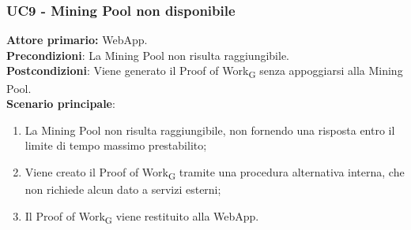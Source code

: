 \subsubsection{UC9  - Mining Pool non disponibile}
\textbf{Attore primario:} WebApp.\\
\textbf{Precondizioni}: La Mining Pool non risulta raggiungibile.\\
\textbf{Postcondizioni}: Viene generato il Proof of Work\textsubscript{G} senza appoggiarsi alla Mining Pool.\\

\textbf{Scenario principale}:
\begin{enumerate}
    \item La Mining Pool non risulta raggiungibile, non fornendo una risposta entro il limite di tempo massimo prestabilito;
    \item Viene creato il Proof of Work\textsubscript{G} tramite una procedura alternativa interna, che non richiede alcun dato a servizi esterni;
    \item Il Proof of Work\textsubscript{G} viene restituito alla WebApp.
\end{enumerate}
